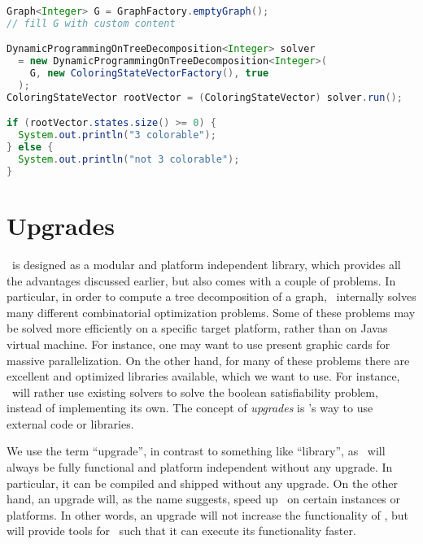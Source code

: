 \documentclass[a4paper, ukenglish, twoside, openright]{jdrasilmanual}
\begin{document}
\begin{lstlisting}[language=Java]
Graph<Integer> G = GraphFactory.emptyGraph();
// fill G with custom content

DynamicProgrammingOnTreeDecomposition<Integer> solver
  = new DynamicProgrammingOnTreeDecomposition<Integer>(
    G, new ColoringStateVectorFactory(), true
  );
ColoringStateVector rootVector = (ColoringStateVector) solver.run();

if (rootVector.states.size() >= 0) {
  System.out.println("3 colorable");
} else {
  System.out.println("not 3 colorable");
}
\end{lstlisting}

\part{Upgrades}\label{part:upgrades}

\Jdrasil\ is designed as a modular and platform independent library,
which provides all the advantages discussed earlier, but also comes
with a couple of problems. In particular, in order to compute a tree
decomposition of a graph, \Jdrasil\ internally solves many different
combinatorial optimization problems. Some of these problems may be
solved more efficiently on a specific target platform, rather than on
Javas virtual machine. For instance, one may want to use present
graphic cards for massive parallelization. On the other hand, for many
of these problems there are excellent and optimized libraries
available, which we want to use. For instance, \Jdrasil\ will rather
use existing  solvers to solve the boolean satisfiability
problem, instead of implementing its own. The concept of
\emph{upgrades} is \Jdrasil's way to use external code or
libraries. 

We use the term ``upgrade'', in contrast to something like
``library'', as \Jdrasil\ will always be fully functional and platform
independent without any upgrade. In particular, it can be compiled and
shipped without any upgrade. On the other hand, an upgrade will, as
the name suggests, speed up \Jdrasil\ on certain instances or
platforms. In other words, an upgrade will not increase the
functionality of \Jdrasil, but will provide tools for \Jdrasil\
such that it can execute its functionality faster.
\end{document}
